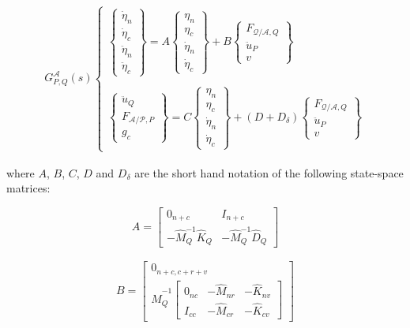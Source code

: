 \documentclass{ifacconf}
\begin{document}
\begin{eqnarray}
\label{eq:TITOP}
G^{\mathcal{A}}_{P,Q}(s)
\left\lbrace
\begin{array}{l}
\begin{Bmatrix}
\dot{\eta}_n\\ 
\dot{\eta}_c \\ 
\ddot{\eta}_n\\ 
\ddot{\eta}_c 
\end{Bmatrix}  = A
\begin{Bmatrix}
\eta_n\\ 
\eta_c \\
\dot{\eta}_n\\ 
\dot{\eta}_c 
\end{Bmatrix} + B \begin{Bmatrix} F_{\mathcal{Q}/\mathcal{A},Q} \\ 
\ddot{u}_P \\ v \end{Bmatrix} \\ \\
\begin{Bmatrix} \ddot{u}_Q  \\  F_{\mathcal{A}/\mathcal{P},P} \\ g_c \end{Bmatrix}= C \begin{Bmatrix}
\eta_n\\ 
\eta_c \\
\dot{\eta}_n\\ 
\dot{\eta}_c 
\end{Bmatrix} + (D + D_\delta )\begin{Bmatrix} F_{\mathcal{Q}/\mathcal{A},Q} \\ 
\ddot{u}_P \\ v \end{Bmatrix} \end{array} \right.
\end{eqnarray}

where $A$, $B$, $C$, $D$ and $D_\delta$ are the short hand notation of the following state-space matrices:


\begin{equation} \label{eq:ATITOP}
A =\left[ \begin{array}{cc}
0_{n+c} & I_{n+c} \\ 
- \hat{M}_Q^{-1} \hat{K}_Q & - \hat{M}_Q^{-1} \hat{D}_Q  
\end{array} \right]
\end{equation}

\begin{eqnarray} \label{eq:BTITOP}
B = \begin{bmatrix}
0_{n+c,c+r+v} \\
\hat{M}_Q^{-1} \begin{bmatrix}
0_{nc}& -\hat{M}_{nr} & -\hat{K}_{nv} \\
I_{cc}& -\hat{M}_{cr} & -\hat{K}_{cv}
\end{bmatrix}
\end{bmatrix} 
\end{eqnarray}
\end{document}
